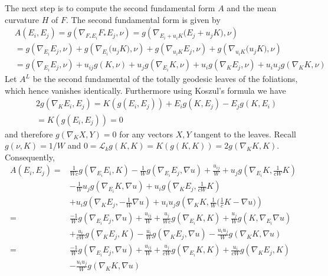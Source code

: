 \documentclass[12pt]{article}
\numberwithin{lemma}{section}
\begin{document}
The next step is to compute the second fundamental form $A$ and the mean curvature $H$ of $F$. The second fundamental form is given by
\begin{align*}
&A\left(E_i,E_j\right)
=g\left(\nabla_{F_*E_i}F_*E_j,\nu\right) =g\left(\nabla_{E_i+u_iK}\big(E_j+u_jK\big),\nu\right)\\
&=g\left(\nabla_{E_i}E_j,\nu\right)
+g\left(\nabla_{E_i}\big(u_jK\big),\nu\right)
+g\left(\nabla_{u_iK}E_j,\nu\right)
+g\left(\nabla_{u_iK} \big(u_jK\big),\nu\right)\\
&=g\left(\nabla_{E_i}E_j,\nu\right)
+u_{ij}g\left(K,\nu\right)
+u_jg\left(\nabla_{E_i}K,\nu\right)
+u_ig\left(\nabla_{K}E_j,\nu\right)
+u_iu_jg\left(\nabla_{K} K,\nu\right)
\end{align*}
Let $A^L$ be the second fundamental of the totally geodesic leaves of the foliations, which hence vanishes identically. Furthermore using Koszul's formula we have
\begin{align*}
&2g\left(\nabla_KE_i,E_j\right)
=K\left(g\left(E_i,E_j\right)\right)
+E_ig\left(K,E_j\right)-E_jg\left(K,E_i\right)\\
& =K\left( g\left(E_i,E_j\right)\right)=0
\end{align*}
and therefore $g(\nabla_KX,Y)=0$ for any vectors $X,Y$ tangent to the leaves. Recall $g(\nu,K)=1/W$ and $0=\mathcal{L}_kg(K,K)=K(g(K,K))=2g(\nabla_KK,K)$. Consequently,  
\begin{align*}
A\left(E_i,E_j\right)=&
\frac{1}{Wc} g\left(\nabla_{E_i}E_i,K\right)
-\frac{1}{W}g\left(\nabla_{E_i}E_j,\nabla u\right) +\frac{u_{ij}}{W} 
+u_jg\left(\nabla_{E_i}K,\frac{1}{c W}K\right) \\
& -\frac{1}{W}u_jg\left(\nabla_{E_i}K,\nabla u\right)
+u_ig\left(\nabla_{K}E_j,\frac{1}{cW}K\right) \\
&+u_ig\left(\nabla_{K}E_j,-\frac{1}{W}\nabla u\right)
+u_iu_jg\left(\nabla_{K} K,\frac{1}{W}\Big(\frac{1}{c}K-\nabla u\Big)\right)\\
=&\frac{-1}{W}g\left(\nabla_{E_i}E_j,\nabla u\right)+\frac{u_{ij}}{W}
+\frac{u_j}{Wc}g\left(\nabla_{E_i}K,K\right)
+\frac{u_j}{W}g\left(K,\nabla_{E_i}\nabla u\right)\\
&+\frac{u_i}{c W} g\left(\nabla_{K}E_j,K\right)-\frac{u_i}{W}g\left(\nabla_{K}E_j,\nabla u\right)-\frac{u_iu_j}{W}g\left(\nabla_{K} K,\nabla u\right)\\
=& \frac{-1}{W}g\left(\nabla_{E_i}E_j,\nabla u\right)
+\frac{u_{ij}}{W}+\frac{u_j}{cW}g\left(\nabla_{E_i}K,K\right)
+\frac{u_i}{cW}g\left(\nabla_{K}E_j,K\right)\\
&-\frac{u_iu_j}{W}g\left(\nabla_{K} K,\nabla u\right)
\end{align*}
\end{document}
